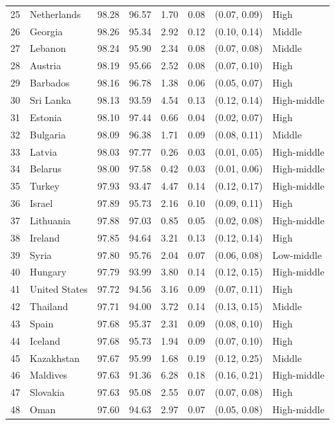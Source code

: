 \begin{longtable}{r l r r r r l l}
25 & Netherlands & 98.28 & 96.57 & 1.70 & 0.08 & (0.07, 0.09) & High \\
26 & Georgia & 98.26 & 95.34 & 2.92 & 0.12 & (0.10, 0.14) & Middle \\
27 & Lebanon & 98.24 & 95.90 & 2.34 & 0.08 & (0.07, 0.08) & Middle \\
28 & Austria & 98.19 & 95.66 & 2.52 & 0.08 & (0.07, 0.10) & High \\
29 & Barbados & 98.16 & 96.78 & 1.38 & 0.06 & (0.05, 0.07) & High \\
30 & Sri Lanka & 98.13 & 93.59 & 4.54 & 0.13 & (0.12, 0.14) & High-middle \\
31 & Estonia & 98.10 & 97.44 & 0.66 & 0.04 & (0.02, 0.07) & High \\
32 & Bulgaria & 98.09 & 96.38 & 1.71 & 0.09 & (0.08, 0.11) & Middle \\
33 & Latvia & 98.03 & 97.77 & 0.26 & 0.03 & (0.01, 0.05) & High-middle \\
34 & Belarus & 98.00 & 97.58 & 0.42 & 0.03 & (0.01, 0.06) & High-middle \\
35 & Turkey & 97.93 & 93.47 & 4.47 & 0.14 & (0.12, 0.17) & High-middle \\
36 & Israel & 97.89 & 95.73 & 2.16 & 0.10 & (0.09, 0.11) & High \\
37 & Lithuania & 97.88 & 97.03 & 0.85 & 0.05 & (0.02, 0.08) & High-middle \\
38 & Ireland & 97.85 & 94.64 & 3.21 & 0.13 & (0.12, 0.14) & High \\
39 & Syria & 97.80 & 95.76 & 2.04 & 0.07 & (0.06, 0.08) & Low-middle \\
40 & Hungary & 97.79 & 93.99 & 3.80 & 0.14 & (0.12, 0.15) & High-middle \\
41 & United States & 97.72 & 94.56 & 3.16 & 0.09 & (0.07, 0.11) & High \\
42 & Thailand & 97.71 & 94.00 & 3.72 & 0.14 & (0.13, 0.15) & Middle \\
43 & Spain & 97.68 & 95.37 & 2.31 & 0.09 & (0.08, 0.10) & High \\
44 & Iceland & 97.68 & 95.73 & 1.94 & 0.09 & (0.07, 0.10) & High \\
45 & Kazakhstan & 97.67 & 95.99 & 1.68 & 0.19 & (0.12, 0.25) & Middle \\
46 & Maldives & 97.63 & 91.36 & 6.28 & 0.18 & (0.16, 0.21) & High-middle \\
47 & Slovakia & 97.63 & 95.08 & 2.55 & 0.07 & (0.07, 0.08) & High \\
48 & Oman & 97.60 & 94.63 & 2.97 & 0.07 & (0.05, 0.08) & High-middle \\

\end{longtable}
